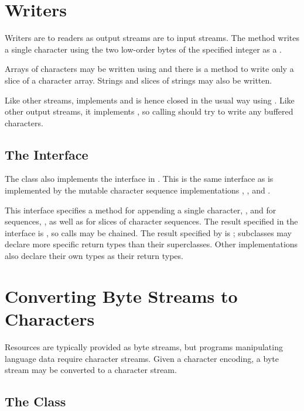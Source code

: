 \section{Writers}

Writers are to readers as output streams are to input streams.  The
method  writes a single character using the two
low-order bytes of the specified integer as a .

Arrays of characters may be written using  and
there is a method to write only a slice of a character array.  Strings
and slices of strings may also be written.  

Like other streams,  implements  and is
hence closed in the usual way using .  Like other output
streams, it implements , so calling 
should try to write any buffered characters.

\subsection{The  Interface}

The  class also implements the 
interface in .  This is the same interface as is
implemented by the mutable character sequence implementations
, , and .

This interface specifies a method for appending a single character,
, and for sequences, ,
as well as for slices of character sequences.  The result specified in
the  interface is , so calls may be
chained.  The result specified by  is ;
subclasses may declare more specific return types than their
superclasses.  Other implementations also declare their own types
as their return types.


\section{Converting Byte Streams to Characters}

Resources are typically provided as byte streams, but programs
manipulating language data require character streams.  Given a
character encoding, a byte stream may be converted to a character
stream. 

\subsection{The  Class}\label{section:io-inputstreamreader}

